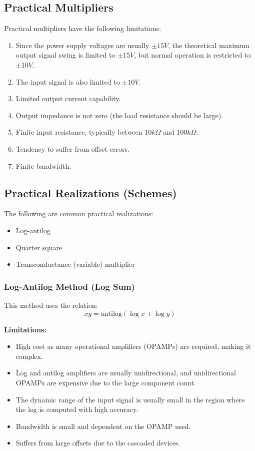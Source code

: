 \documentclass[a4paper,9pt,twoside,openany,twocolumn]{memoir}
\begin{document}
\subsection{Practical Multipliers}
Practical multipliers have the following limitations:
\begin{enumerate}
    \item Since the power supply voltages are usually \( \pm 15V \), the theoretical maximum output signal swing is limited to \( \pm 15V \), but normal operation is restricted to \( \pm 10V \).
    \item The input signal is also limited to \( \pm 10V \).
    \item Limited output current capability.
    \item Output impedance is not zero (the load resistance should be large).
    \item Finite input resistance, typically between \( 10k\Omega \) and \( 100k\Omega \).
    \item Tendency to suffer from offset errors.
    \item Finite bandwidth.
\end{enumerate}

\subsection{Practical Realizations (Schemes)}
The following are common practical realizations:
\begin{itemize}
    \item Log-antilog
    \item Quarter square
    \item Transconductance (variable) multiplier
\end{itemize}

\subsubsection{Log-Antilog Method (Log Sum)}
This method uses the relation:
\[
xy = \text{antilog}(\log x + \log y)
\]

\textbf{Limitations:}
\begin{itemize}
    \item High cost as many operational amplifiers (OPAMPs) are required, making it complex.
    \item Log and antilog amplifiers are usually unidirectional, and unidirectional OPAMPs are expensive due to the large component count.
    \item The dynamic range of the input signal is usually small in the region where the log is computed with high accuracy.
    \item Bandwidth is small and dependent on the OPAMP used.
    \item Suffers from large offsets due to the cascaded devices.
\end{itemize}
\end{document}
